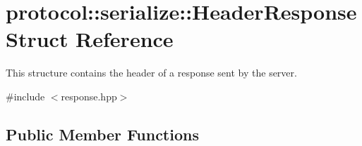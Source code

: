 \hypertarget{structprotocol_1_1serialize_1_1_header_response}{}\section{protocol\+:\+:serialize\+:\+:Header\+Response Struct Reference}
\label{structprotocol_1_1serialize_1_1_header_response}


This structure contains the header of a response sent by the server.  




{\ttfamily \#include $<$response.\+hpp$>$}

\subsection*{Public Member Functions}
